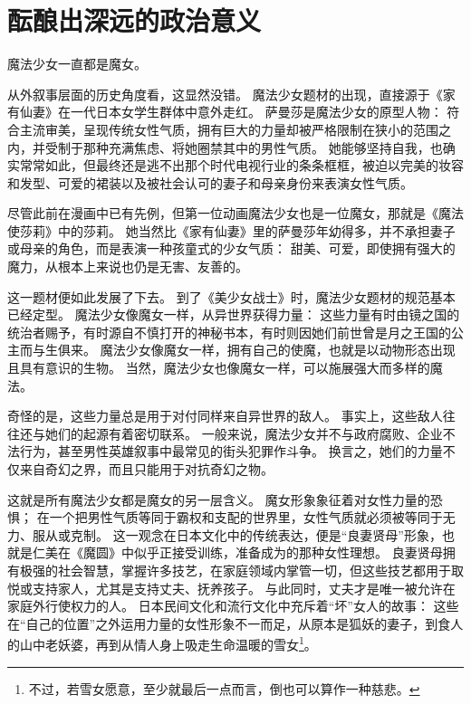 \chapter[酝酿出深远的政治意义]{酝酿出深远的政治意义}



魔法少女一直都是魔女。

从外叙事层面的历史角度看，这显然没错。
魔法少女题材的出现，直接源于《家有仙妻》在一代日本女学生群体中意外走红\cite{ref48}。
萨曼莎是魔法少女的原型人物：
符合主流审美，呈现传统女性气质，拥有巨大的力量却被严格限制在狭小的范围之内，并受制于那种充满焦虑、将她圈禁其中的男性气质。
她能够坚持自我，也确实常常如此，但最终还是逃不出那个时代电视行业的条条框框，被迫以完美的妆容和发型、可爱的裙装以及被社会认可的妻子和母亲身份来表演女性气质\cite{ref49}。

尽管此前在漫画中已有先例，但第一位动画魔法少女也是一位魔女，那就是《魔法使莎莉》中的莎莉。
她当然比《家有仙妻》里的萨曼莎年幼得多，并不承担妻子或母亲的角色，而是表演一种孩童式的少女气质：
甜美、可爱，即使拥有强大的魔力，从根本上来说也仍是无害、友善的\cite{ref50}。

这一题材便如此发展了下去。
到了《美少女战士》时，魔法少女题材的规范基本已经定型。
魔法少女像魔女一样，从异世界获得力量：
这些力量有时由镜之国的统治者赐予，有时源自不慎打开的神秘书本，有时则因她们前世曾是月之王国的公主而与生俱来。
魔法少女像魔女一样，拥有自己的使魔，也就是以动物形态出现且具有意识的生物。
当然，魔法少女也像魔女一样，可以施展强大而多样的魔法。

奇怪的是，这些力量总是用于对付同样来自异世界的敌人。
事实上，这些敌人往往还与她们的起源有着密切联系。
一般来说，魔法少女并不与政府腐败、企业不法行为，甚至男性英雄叙事中最常见的街头犯罪作斗争。
换言之，她们的力量不仅来自奇幻之界，而且只能用于对抗奇幻之物。

这就是所有魔法少女都是魔女的另一层含义。
魔女形象象征着对女性力量的恐惧；
在一个把男性气质等同于霸权和支配的世界里，女性气质就必须被等同于无力、服从或克制\cite{ref51}。
这一观念在日本文化中的传统表达，便是“良妻贤母”形象，也就是仁美在《魔圆》中似乎正接受训练，准备成为的那种女性理想。
良妻贤母拥有极强的社会智慧，掌握许多技艺，在家庭领域内掌管一切，但这些技艺都用于取悦或支持家人，尤其是支持丈夫、抚养孩子。
与此同时，丈夫才是唯一被允许在家庭外行使权力的人\cite{ref52}。
日本民间文化和流行文化中充斥着“坏”女人的故事：
这些在“自己的位置”之外运用力量的女性形象不一而足，从原本是狐妖的妻子\cite{ref53}，到食人的山中老妖婆\cite{ref54}，再到从情人身上吸走生命温暖的雪女\footnote{%
    不过，若雪女愿意，至少就最后一点而言，倒也可以算作一种慈悲。
}\cite{ref55}。

